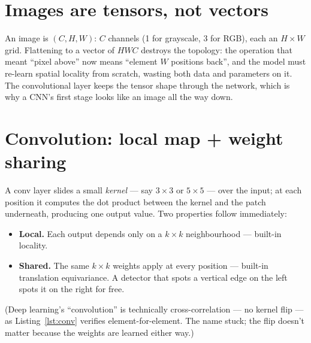 \section{Images are tensors, not vectors}
\label{sec:tensors}

An image is $(C, H, W)$: $C$ channels (1 for
grayscale, 3 for RGB), each an $H\times W$ grid. Flattening to a
vector of $HWC$ destroys the topology: the operation that meant
``pixel above'' now means ``element $W$ positions back'', and the
model must re-learn spatial locality from scratch, wasting both data
and parameters on it. The convolutional layer keeps the tensor shape
through the network, which is why a CNN's first stage looks like an
image all the way down.

\section{Convolution: local map + weight sharing}
\label{sec:conv}

A conv layer slides a small \emph{kernel} ---
say $3\times3$ or $5\times5$ --- over the input; at each position it
computes the dot product between the kernel and the patch underneath,
producing one output value. Two properties follow immediately:

\begin{itemize}
\item \textbf{Local.} Each output depends only on a $k\times k$
neighbourhood --- built-in locality.
\item \textbf{Shared.} The same $k\times k$ weights apply at every
position --- built-in translation equivariance. A detector that spots
a vertical edge on the left spots it on the right for free.
\end{itemize}

(Deep learning's ``convolution'' is technically cross-correlation ---
no kernel flip --- as Listing~\ref{lst:conv} verifies element-for-element.
The name stuck; the flip doesn't matter because the weights are learned
either way.)

